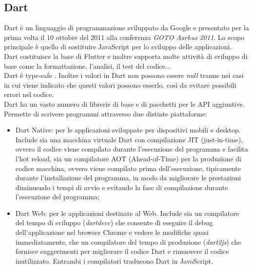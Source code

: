 \subsection{Dart}
\label{sec:Dart}
Dart \cite{dart,dartstoria} è un linguaggio di programmazione sviluppato da Google e presentato per la prima volta il 10 ottobre del 2011 alla conferenza \textit{GOTO Aarhus 2011}.
Lo scopo principale è quello di sostituire JavaScript per lo sviluppo delle applicazioni.\\
Dart costituisce la base di Flutter e inoltre supporta molte attività di sviluppo di base come la formattazione, l'analisi, il test del codice...\\
Dart è type-safe \cite{dartover}. Inoltre i valori in Dart non possono essere \textit{null} tranne nei casi in cui viene indicato che questi valori possono esserlo, così da evitare possibili errori nel codice.\\
Dart ha un vasto numero di librerie di base e di pacchetti per le API aggiuntive.\\
Permette di scrivere programmi attraverso due distinte piattaforme: 
\begin{itemize}
	\item Dart Native: per le applicazioni sviluppate per dispositivi mobili e desktop. Include sia una macchina virtuale Dart con compilazione JIT (just-in-time), ovvero il codice viene compilato durante l'esecuzione del programma e facilita l'hot reload, sia un compilatore AOT (Ahead-of-Time) per la produzione di codice macchina, ovvero  viene compilato prima dell'esecuzione, tipicamente durante l'installazione del programma, in modo da migliorare le prestazioni diminuendo i tempi di avvio e evitando la fase di compilazione durante l'esecuzione del programma;  
	\item Dart Web: per le applicazioni destinate al Web. Include sia un compilatore del tempo di sviluppo (\textit{dartdevc}) che consente di eseguire il debug dell'applicazione nel browser Chrome e vedere le modifiche quasi immediatamente, che un compilatore del tempo di produzione (\textit{dart2js}) che fornisce suggerimenti per migliorare il codice Dart e rimuovere il codice inutilizzato. Entrambi i compilatori traducono Dart in JavaScript.\\
\end{itemize}

